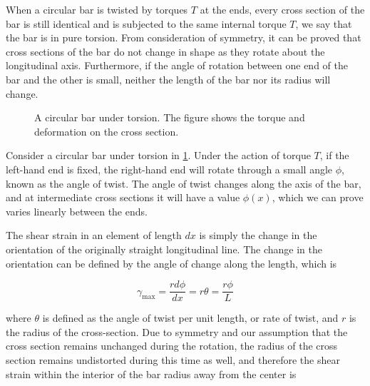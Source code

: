 \documentclass[a4paper,openany,nobib]{tufte-book}
\begin{document}
When a circular bar is twisted by torques \(T\) at the ends, every cross
section of the bar is still identical and is subjected to the same
internal torque \(T\), we say that the bar is in pure torsion. From
consideration of symmetry, it can be proved that cross sections of the
bar do not change in shape as they rotate about the longitudinal axis.
Furthermore, if the angle of rotation between one end of the bar and the
other is small, neither the length of the bar nor its radius will
change.

\begin{figure}[h]
  \centering
  \caption{A circular bar under torsion. The figure shows the torque and deformation on the cross section.}
  \label{fig: 3d torsional deformation}
\end{figure}

Consider a circular bar under torsion in \ref{fig: 3d torsional deformation}.
Under the action of torque \(T\), if the left-hand end is fixed, the
right-hand end will rotate through a small angle \(\phi\), known as the
angle of twist. The angle of twist changes along the axis of the bar,
and at intermediate cross sections it will have a value \(\phi(x)\), which
we can prove varies linearly between the ends.

The shear strain in an element of length \(dx\) is simply the change in
the orientation of the originally straight longitudinal line. The change
in the orientation can be defined by the angle of change along the
length, which is

$$\gamma _{\max } = \frac{rd\phi }{dx} = r\theta  = \frac{r\phi }{L}$$

where \(\theta\) is defined as the angle of twist per unit length, or rate
of twist, and \(r\) is the radius of the cross-section. Due to symmetry
and our assumption that the cross section remains unchanged during the
rotation, the radius of the cross section remains undistorted during
this time as well, and therefore the shear strain within the interior of
the bar radius away from the center is
\end{document}
